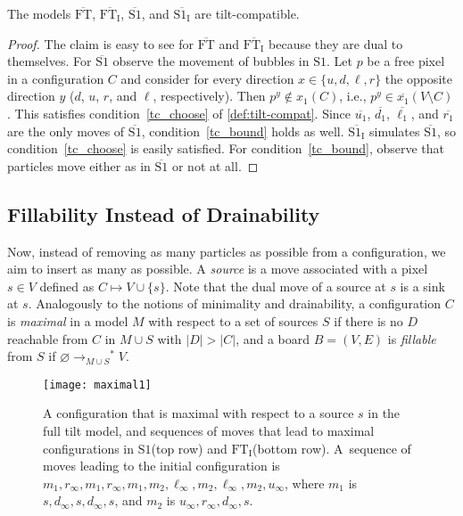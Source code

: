 \documentclass[a4paper,UKenglish,cleveref,thm-restate]{lipics-v2021}
\newcommand{\FT}{\ensuremath{\mathrm{FT}}\xspace}
\newcommand{\SSt}{\ensuremath{\mathrm{S1}}\xspace}
\newcommand{\IE}[1][\FT]{\ensuremath{{#1}_\mathrm{I}}\xspace}
\newcommand{\dual}[1]{\ensuremath{\overline{#1}}\xspace}
\newcommand{\rOne}[1][M]{\ensuremath{\rightarrow_{#1}}}
\newcommand{\rStar}[1][M]{\rOne[#1]^*}
\begin{document}
\begin{proposition}\label{prop:concrete-duals-tc}
The models \dual{\FT}, \dual{\IE}, \dual{\SSt}, and \dual{\IE[\SSt]} are
tilt-compatible.
\end{proposition}
\begin{proof}
The claim is easy to see for \dual{\FT} and \dual{\IE} because they are dual to
themselves. For \dual{\SSt} observe the movement of bubbles in \SSt. Let $p$ be a
free pixel in a configuration $C$ and consider for every direction \(x \in \{u,
d, \ell, r\}\) the opposite direction $y$ ($d$, $u$, $r$, and $\ell$,
respectively). Then \(p^y \notin x_1(C)\), i.e., \(p^y \in \dual{x_1}(V
\setminus C)\). This satisfies condition~\ref{tc_choose} of
\cref{def:tilt-compat}. Since $\dual{u_1}$, $\dual{d_1}$, $\dual{\ell_1}$, and
$\dual{r_1}$ are the only moves of $\dual{\SSt}$, condition~\ref{tc_bound}
holds as well. \dual{\IE[\SSt]} simulates \dual{\SSt}, so
condition~\ref{tc_choose} is easily satisfied. For condition~\ref{tc_bound},
observe that particles move either as in $\dual{\SSt}$ or not at all.
\end{proof}

\subsection{Fillability Instead of Drainability}

Now, instead of removing as many particles as possible from a configuration, we
aim to insert as many as possible. A \emph{source} is a move associated with a
pixel $s \in V$ defined as \(C \mapsto V \cup \{s\}\). Note that the dual move
of a source at $s$ is a sink at $s$. Analogously to the notions of minimality
and drainability, a configuration $C$ is \emph{maximal} in a model $M$ with
respect to a set of sources $S$ if there is no $D$ reachable from $C$ in \(M
\cup S\) with \(|D| > |C|\), and a board $B=(V,E)$ is \emph{fillable} from $S$
if \(\varnothing \rStar[M \cup S] V\).

\begin{figure}[htb]
\centering
\texttt{[image: maximal1]}\caption{A configuration that is maximal with respect to a source $s$ in the
  full tilt model, and sequences of moves that lead to maximal configurations in
  \SSt (top row) and \IE (bottom row).
  A~sequence of moves leading to the initial configuration is
  \(m_1, r_\infty, m_1, r_\infty, m_1, m_2, \ell_\infty, m_2, \ell_\infty, m_2, u_\infty\),
  where $m_1$ is \(s, d_\infty, s, d_\infty, s\), and $m_2$ is
  \(u_\infty, r_\infty, d_\infty, s\).}\label{fig:maximal1}
\end{figure}
\end{document}
